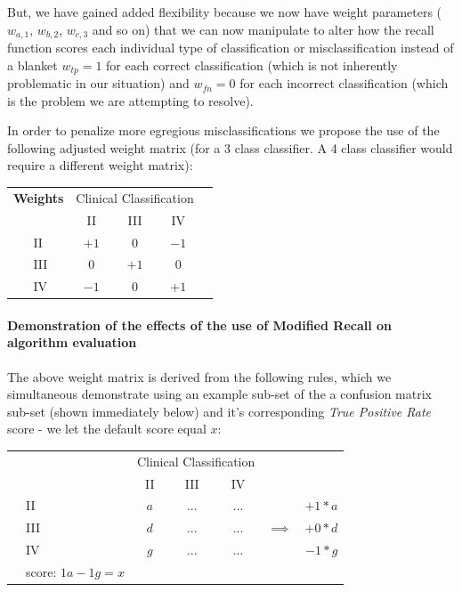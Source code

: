\documentclass[]{article}
\begin{document}
But, we have gained added flexibility because we now have weight parameters ($w_{a,1}$, $w_{b,2}$, $w_{c,3}$ and so on) that we can now manipulate to alter how the recall function scores each individual type of classification or misclassification instead of a blanket $w_{tp} = 1$ for each correct classification (which is not inherently problematic in our situation) and $w_{fn} = 0$ for each incorrect classification (which is the problem we are attempting to resolve). 

In order to penalize more egregious misclassifications we propose the use of the following adjusted weight matrix (for a 3 class classifier. A 4 class classifier would require a different weight matrix):

\begin{center}
	\begin{tabular}{l|l|c|c|c|c}
		\multicolumn{2}{c}{\textbf{Weights}}&\multicolumn{3}{c}{Clinical Classification}\\
		\cline{3-5}
		\multicolumn{2}{c|}{}&II&III&IV\\
		\cline{2-5}
		\multirow{5}{0.8cm}{\rotatebox{90}{\parbox{0.8cm}{\centering Algorithm \\ Classification}}} %
		& II & $+1$ & $0$ & $-1$\\
		\cline{2-5}
		& III & $0$ & $+1$ & $0$\\
		\cline{2-5}
		& IV & $-1$ & $0$ & $+1$\\
		\cline{2-5}
	\end{tabular}
\end{center}

\paragraph{Demonstration of the effects of the use of Modified Recall on algorithm evaluation}

The above weight matrix is derived from the following rules, which we simultaneous demonstrate using an example sub-set of the a confusion matrix sub-set (shown immediately below) and it's corresponding \textit{True Positive Rate} score - we let the default score equal $x$:

\begin{center}
	\begin{tabular}{l|l|c|c|c|cr}
		\multicolumn{2}{c}{}&\multicolumn{3}{c}{Clinical Classification}&&\\
		\cline{3-5}
		\multicolumn{2}{c|}{}&II&III&IV&&\\
		\cline{2-5}
		\multirow{5}{0.8cm}{\rotatebox{90}{\parbox{0.8cm}{\centering Algorithm \\ Classification}}} %
		& II & $a$ & $...$ & $...$ & & $+1*a$\\
		\cline{2-5}
		& III & $d$ & $...$ & $...$ & $\implies$ & $+0*d$\\
		\cline{2-5}
		& IV & $g$ & $...$ & $...$ & & \underline{$-1*g$}\\
		\cline{2-5}
		\multicolumn{6}{c}{} & score: $1a-1g = x$
	\end{tabular}
\end{center}
\end{document}
